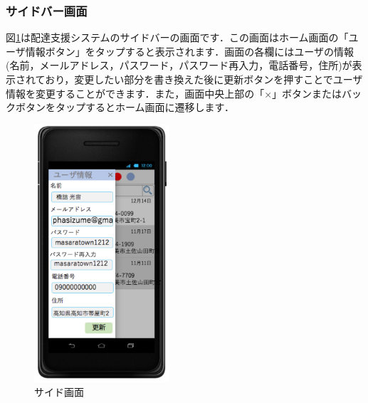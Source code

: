 \documentclass[a4j,titlepage]{jarticle}
\begin{document}
\subsubsection{サイドバー画面}
図\ref{fig:user_side}は配達支援システムのサイドバーの画面です．この画面はホーム画面の「ユーザ情報ボタン」をタップすると表示されます．画面の各欄にはユーザの情報(名前，メールアドレス，パスワード，パスワード再入力，電話番号，住所)が表示されており，変更したい部分を書き換えた後に更新ボタンを押すことでユーザ情報を変更することができます．また，画面中央上部の「×」ボタンまたはバックボタンをタップするとホーム画面に遷移します．

\begin{figure}[htbp]
 \begin{center}
  \includegraphics[width=50mm]{user_side.pdf}
	\caption{サイド画面}
	\label{fig:user_side}
 \end{center}

\end{figure}
\end{document}
